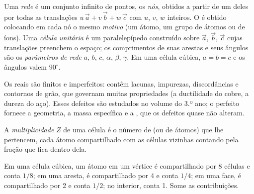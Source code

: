 \begin{definition}\label{def:b1:crystals-metals:lattice}
Uma \emph{rede} é um conjunto infinito de pontos, os
\emph{nós}, obtidos a partir de um deles por todas as
translações $u\,\vec a + v\,\vec b + w\,\vec c$ com $u$, $v$,
$w$ inteiros. O  é obtido colocando em cada nó o mesmo
\emph{motivo} (um átomo, um grupo de átomos ou de íons).
Uma \emph{célula unitária} é um paralelepípedo construído sobre
$\vec a$, $\vec b$, $\vec c$ cujas translações preenchem o espaço; os
comprimentos de suas arestas e seus ângulos são os \emph{parâmetros de
rede}
$a$, $b$, $c$, $\alpha$, $\beta$, $\gamma$. Em uma célula cúbica,
$a = b = c$ e os ângulos valem $90^\circ$.
\end{definition}

\begin{remark}\label{rem:b1:crystals-metals:real}
Os  reais são finitos e imperfeitos: contêm lacunas, impurezas,
discordâncias e contornos de grão, que governam muitas propriedades (a
ductilidade do cobre, a dureza do aço). Esses defeitos são estudados no
volume do 3.º ano; o  perfeito fornece a geometria, a massa
específica e a , que os defeitos quase não alteram.
\end{remark}

\begin{definition}\label{def:b1:crystals-metals:multiplicity}
A \emph{multiplicidade} $Z$ de uma célula é o número de
 (ou de átomos) que lhe pertencem, cada átomo compartilhado com
as células vizinhas contando pela fração que fica dentro dela.
\end{definition}

\begin{method}\label{met:b1:crystals-metals:count}
Em uma célula cúbica, um átomo em um vértice é compartilhado por 8
células e conta $1/8$; em uma aresta, é compartilhado por 4 e conta
$1/4$; em uma face, é compartilhado por 2 e conta $1/2$; no interior,
conta 1. Some as contribuições.
\end{method}

